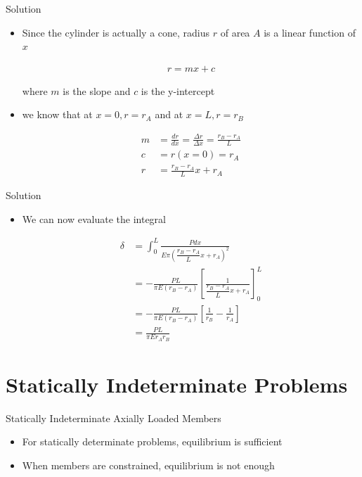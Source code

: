 \documentclass[10pt, svgnames]{beamer}
\begin{document}
\begin{frame}[label={sec:org3a87405}]{Solution}
\begin{itemize}
\item Since the cylinder is actually a cone, radius \(r\) of area \(A\) is a linear function of \(x\)

\begin{align*}
  r = mx + c
\end{align*}

where \(m\) is the slope and \(c\) is the y-intercept

\item we know that at \(x = 0, r = r_{A}\) and at \(x = L, r = r_{B}\)

\begin{align*}
  m &= \frac{dr}{dx} = \frac{\Delta r}{\Delta x} = \frac{r_{B} - r_{A}}{L} \\
  c &= r(x = 0) = r_{A} \\
  r &=  \frac{r_{B} - r_{A}}{L} x + r_{A}
\end{align*}
\end{itemize}
\end{frame}

\begin{frame}[label={sec:orgf10161c}]{Solution}
\begin{itemize}
\item We can now evaluate the integral

\begin{align*}
  \delta &= \int_{0}^{L} \frac{Pdx}{E \pi \left( \dfrac{r_{B} - r_{A}}{L} x + r_{A} \right)^{2}} \\
         &= - \frac{PL}{\pi E \left( r_{B} - r_{A}  \right)} \left[ \frac{1}{ \dfrac{ r_{B} - r_{A} }{L} x + r_{A} } \right]_{0}^{L} \\
         &= - \frac{PL}{\pi E \left( r_{B} - r_{A}  \right)} \left[ \frac{1}{r_{B}} - \frac{1}{r_{A}} \right] \\
         &= \frac{PL}{\pi E r_{A} r_{B}}
\end{align*}
\end{itemize}
\end{frame}

\section{Statically Indeterminate Problems}
\label{statically-indeterminate-problems}
\begin{frame}[label={sec:orgcc6c9fd}]{Statically Indeterminate Axially Loaded Members}
\begin{itemize}
\item For statically determinate problems, equilibrium is sufficient

\item When members are constrained, equilibrium is not enough
\end{itemize}
\end{frame}
\end{document}
